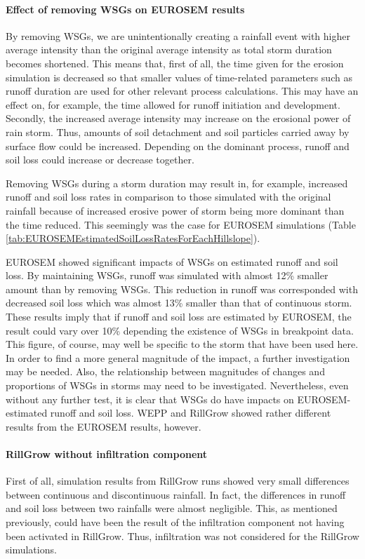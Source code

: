 \paragraph{Effect of removing WSGs on EUROSEM results} By removing WSGs, we
are unintentionally creating a rainfall event with higher average intensity than
the original average intensity as total storm duration becomes shortened. This
means that, first of all, the time given for the erosion simulation is decreased
so that smaller values of time-related parameters such as runoff duration are
used for other relevant process calculations. This may have an effect on, for
example, the time allowed for runoff initiation and development. Secondly, the
increased average intensity may increase on the erosional power of rain
storm. Thus, amounts of soil detachment and soil particles carried away by
surface flow could be increased. Depending on the dominant process, runoff and
soil loss could increase or decrease together.

Removing WSGs during a storm duration may result in, for example, increased
runoff and soil loss rates in comparison to those simulated with the original
rainfall because of increased erosive power of storm being more dominant than
the time reduced. This seemingly was the case for EUROSEM simulations (Table
\ref{tab:EUROSEMEstimatedSoilLossRatesForEachHillslope}).

EUROSEM showed significant impacts of WSGs on estimated runoff and soil loss. By
maintaining WSGs, runoff was simulated with almost 12\% smaller amount than by
removing WSGs. This reduction in runoff was corresponded with decreased soil
loss which was almost 13\% smaller than that of continuous storm. These results
imply that if runoff and soil loss are estimated by EUROSEM, the result could
vary over 10\% depending the existence of WSGs in breakpoint data. This figure,
of course, may well be specific to the storm that have been used here. In order
to find a more general magnitude of the impact, a further investigation may be
needed. Also, the relationship between magnitudes of changes and proportions of
WSGs in storms may need to be investigated. Nevertheless, even without any
further test, it is clear that WSGs do have impacts on EUROSEM-estimated runoff
and soil loss.
WEPP and RillGrow showed rather different results from the EUROSEM results,
however.

\paragraph{RillGrow without infiltration component} First of all, simulation
results from RillGrow runs showed very small differences between continuous and
discontinuous rainfall. In fact, the differences in runoff and soil loss between
two rainfalls were almost negligible. This, as mentioned previously, could have
been the result of the infiltration component not having been activated in
RillGrow. Thus, infiltration was not considered for the RillGrow simulations.


